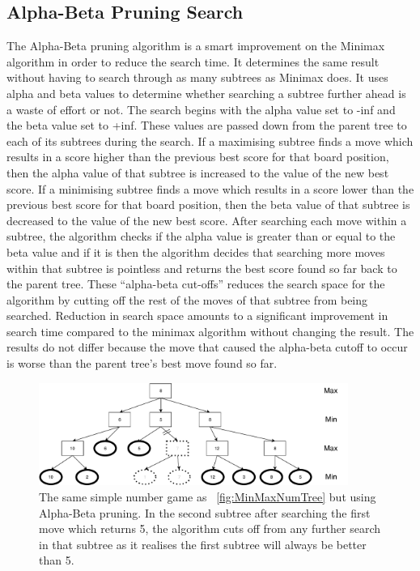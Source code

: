 \documentclass{l4proj}
\begin{document}
\subsection{Alpha-Beta Pruning Search}
The Alpha-Beta pruning algorithm is a smart improvement on the Minimax algorithm in order to reduce the search time. It determines the same result without having to search through as many subtrees as Minimax does. It uses alpha and beta values to determine whether searching a subtree further ahead is a waste of effort or not. The search begins with the alpha value set to -inf and the beta value set to +inf. These values are passed down from the parent tree to each of its subtrees during the search. If a maximising subtree finds a move which results in a score higher than the previous best score for that board position, then the alpha value of that subtree is increased to the value of the new best score. If a minimising subtree finds a move which results in a score lower than the previous best score for that board position, then the beta value of that subtree is decreased to the value of the new best score. After searching each move within a subtree, the algorithm checks if the alpha value is greater than or equal to the beta value and if it is then the algorithm decides that searching more moves within that subtree is pointless and returns the best score found so far back to the parent tree. These “alpha-beta cut-offs” reduces the search space for the algorithm by cutting off the rest of the moves of that subtree from being searched. Reduction in search space amounts to a significant improvement in search time compared to the minimax algorithm without changing the result. The results do not differ because the move that caused the alpha-beta cutoff to occur is worse than the parent tree’s best move found so far.

\begin{figure}[!ht]
\centering
\includegraphics[width=0.9\textwidth]{ABNumTree.pdf}

\caption{The same simple number game as ~\autoref{fig:MinMaxNumTree} but using Alpha-Beta pruning. In the second subtree after searching the first move which returns 5, the algorithm cuts off from any further search in that subtree as it realises the first subtree will always be better than 5. }
\label{fig:ABNumTree}
\end{figure}
\end{document}
